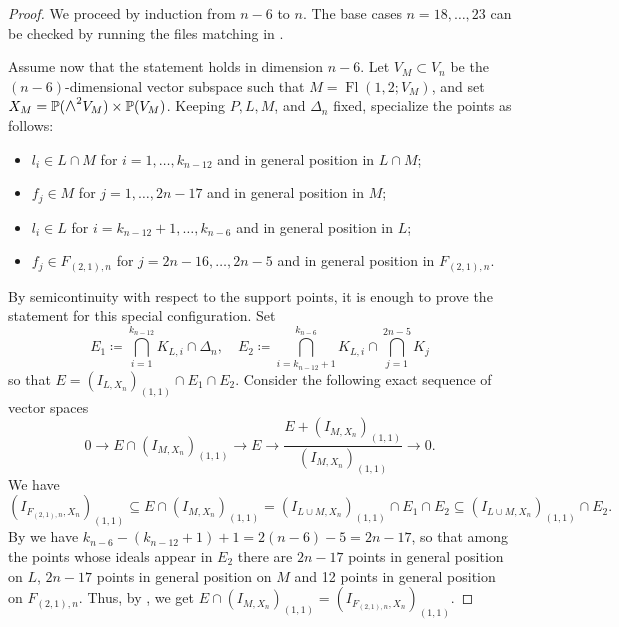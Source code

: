 \documentclass[a4paper,reqno]{amsart}
\theoremstyle{plainnopunct}
\theoremstyle{definitionnopunct}
\newcommand{\superwedge}{\mathlarger{\mathlarger{\wedge}}}
\renewcommand{\P}{\mathbb{P}}
\DeclareMathOperator{\Fl}{Fl}
\begin{document}
\begin{proof}
We proceed by induction from $n-6$ to $n$.
The base cases $n=18,\dots,23$ can be checked by running
the files matching  in
\cite{Repo}.

Assume now that the statement holds in dimension $n-6$. Let
$V_M\subset V_n$ be the $(n-6)$-dimensional vector subspace
such that $M=\Fl(1,2;V_M)$, and set
$X_M=\P(\superwedge^2V_M)\times\P(V_M)$.
Keeping $P,L,M$, and $\Delta_n$ fixed, specialize the points as
follows:
\begin{itemize}[leftmargin=*]
\item $l_i\in L\cap M$ for $i=1,\dots,k_{n-12}$ and in general position in $L\cap M$;
\item $f_j\in M$ for $j=1,\dots,2n-17$ and in general position in $M$;
\item $l_i\in L$ for $i=k_{n-12}+1,\dots,k_{n-6}$ and in general position in $L$;
\item $f_j\in F_{(2,1),n}$ for $j=2n-16,\dots,2n-5$ and in general position in $F_{(2,1),n}$.
\end{itemize}
By semicontinuity with respect to the support points, it is
enough to prove the statement for this special configuration. Set
$$E_1\coloneq \bigcap_{i=1}^{k_{n-12}}K_{L,i}\cap\Delta_n,\quad E_2\coloneq \bigcap_{i=k_{n-12}+1}^{k_{n-6}}K_{L,i}\cap\bigcap_{j=1}^{2n-5}K_j$$
so that $E=(I_{L,X_n})_{(1,1)}\cap E_1\cap E_2$. Consider the following exact sequence of vector spaces
$$0\longrightarrow E\cap (I_{M,X_n})_{(1,1)}\longrightarrow E\longrightarrow \frac{E+(I_{M,X_n})_{(1,1)}}{(I_{M,X_n})_{(1,1)}}\longrightarrow 0.$$
We have 
\[
(I_{F_{(2,1),n},X_n})_{(1,1)}\subseteq E\cap (I_{M,X_n})_{(1,1)}=(I_{L\cup M,X_n})_{(1,1)}\cap E_1\cap E_2\subseteq (I_{L\cup M,X_n})_{(1,1)}\cap E_2.
\]
By  we have $k_{n-6}-(k_{n-12}+1)+1=2(n-6)-5=2n-17$, so that among the points whose ideals appear in $E_2$ there are $2n-17$ points in general position on $L$, $2n-17$ points in general position on $M$ and 12 points in general position on $F_{(2,1),n}$. Thus, by , we get $E\cap(I_{M,X_n})_{(1,1)}=(I_{F_{(2,1),n},X_n})_{(1,1)}$. 


\end{proof}
\end{document}
